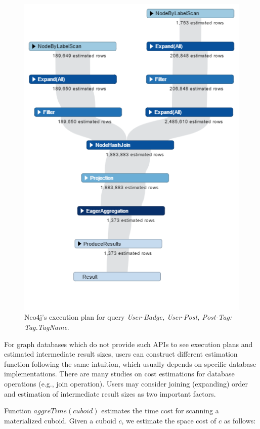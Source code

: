	\begin {figure}[T]
	\centering
	\includegraphics[scale=0.6]{pic/61.png}
	\caption{Neo4j's execution plan for query \textit{User-Badge, User-Post, Post-Tag: Tag.TagName}.}
	\label{fig:4:2}
\end{figure}

For graph databases which do not provide such APIs to see execution plans and estimated intermediate result sizes, users can construct different estimation function following the same intuition, which usually depends on specific database implementations. There are many studies on cost estimations for database operations (e.g., join operation). Users may consider joining (expanding) order \cite{DBLP:conf/pods/Chaudhuri98} and estimation of intermediate result sizes  \cite{DBLP:conf/edbt/SwamiS94} as two important factors. 

Function \textbf{$aggreTime(cuboid)$} estimates the time cost for scanning a materialized cuboid. Given a cuboid $c$, we estimate the space cost of $c$ as follows:


